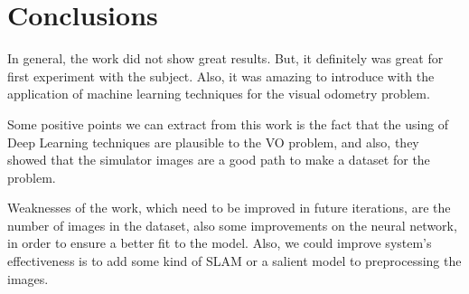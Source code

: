 \section{Conclusions} \label{sec:conclusao}
    In general, the work did not show great results. But, it definitely was great for first experiment with the subject. Also, it was amazing to introduce with the application of machine learning techniques for the visual odometry problem.
    
    Some positive points we can extract from this work is the fact that the using of Deep Learning techniques are plausible to the VO problem, and also, they showed that the simulator images are a good path to make a dataset for the problem.
    
    Weaknesses of the work, which need to be improved in future iterations, are the number of images in the dataset, also some improvements on the neural network, in order to ensure a better fit to the model. Also, we could improve system's effectiveness is to add some kind of SLAM \cite{lim2014real} or a salient model to preprocessing the images.